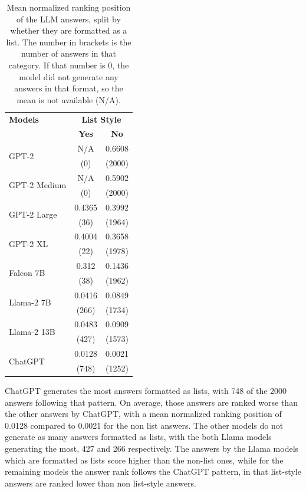 \begin{table}[tb]
    \centering
    \begin{tabular}{lcc}
    \hline
    \textbf{Models} & \multicolumn{2}{c}{\textbf{List Style}} \\
    \cline{2-3} 
    & \textbf{Yes} & \textbf{No} \\
    \hline
    \multirow{2}{*}{GPT-2}        & N/A           & 0.6608  \\
                                  & (0)           & (2000) \\
    \multirow{2}{*}{GPT-2 Medium} & N/A           & 0.5902  \\
                                  & (0)           & (2000) \\
    \multirow{2}{*}{GPT-2 Large}  & 0.4365        & 0.3992  \\
                                  & (36)          & (1964) \\
    \multirow{2}{*}{GPT-2 XL}     & 0.4004        & 0.3658   \\
                                  & (22)          & (1978)  \\
    \multirow{2}{*}{Falcon 7B}    & 0.312         & 0.1436  \\
                                  & (38)          & (1962) \\
    \multirow{2}{*}{Llama-2 7B}   & 0.0416        & 0.0849  \\
                                  & (266)         & (1734) \\
    \multirow{2}{*}{Llama-2 13B}  & 0.0483        & 0.0909  \\
                                  & (427)         & (1573) \\
    \multirow{2}{*}{ChatGPT}      & 0.0128        & 0.0021  \\
                                  & (748)         & (1252) \\
    \hline
    \end{tabular}
    \caption{Mean normalized ranking position of the LLM answers, split by whether they are formatted as a list. The number in brackets is the number of answers in that category. If that number is 0, the model did not generate any answers in that format, so the mean is not available (N/A).}

    \label{tab:badly_ranked_answers}
\end{table}
ChatGPT generates the most answers formatted as lists, with 748 of the 2000 answers following that pattern.
On average, those answers are ranked worse than the other answers by ChatGPT, with a mean normalized ranking position of 0.0128 compared to 0.0021 for the non list answers.
The other models do not generate as many answers formatted as lists, with the both Llama models generating the most, 427 and 266 respectively.
The answers by the Llama models which are formatted as lists score higher than the non-list ones, while for the remaining models the answer rank follows the ChatGPT pattern, in that list-style answers are ranked lower than non list-style answers.

